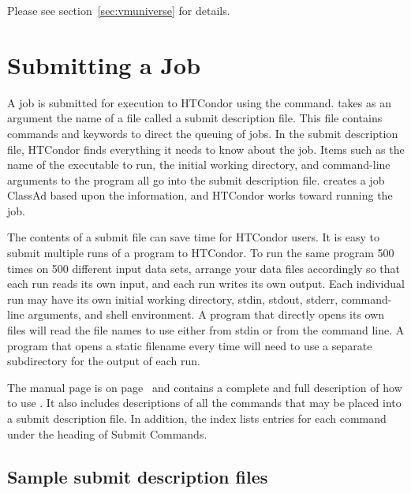 Please see section~\ref{sec:vmuniverse} for details.


\section{Submitting a Job}

A job is submitted for execution to HTCondor using the
 command.
 takes as an argument the name of a
file called a submit description file.
This file contains commands and keywords to direct the queuing of jobs.
In the submit description file, HTCondor finds everything it needs
to know about the job.  Items such as the name of the executable to run,
the initial working directory, and command-line arguments to the
program all go into
the submit description file.   creates a job
ClassAd based upon the information,
and HTCondor
works toward running the job.

The contents of a submit file
can save time for HTCondor users.
It is easy to submit multiple runs of a program to
HTCondor. To run the same program 500 times on 500
different input data sets, arrange your data files
accordingly so that each run reads its own input, and each run
writes its own output.
Each individual run may have its own initial
working directory, stdin, stdout, stderr, command-line arguments, and
shell environment.
A program that directly opens its own
files will read the file names to use either from stdin
or from the command line. 
A program that opens a static filename every time
will need to use a separate subdirectory for the output of each run.

The  manual page 
is on page~\pageref{man-condor-submit} and
contains a complete and full description of how to use .
It also includes descriptions of all the commands that may be placed
into a submit description file.
In addition, the index lists entries for each command under the
heading of Submit Commands.

\subsection{\label{sec:sample-submit-files}Sample submit description files}  

